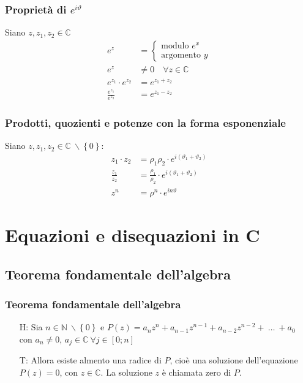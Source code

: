 \documentclass[a4paper]{article}
\begin{document}
\subsubsection*{Proprietà di \(e ^ {i \vartheta}\)}
Siano \(z, z_1, z_2 \in \mathbb{C}\)
\begin{align*}
	e^z &=
	\begin{cases}
		\text{modulo } e^x \\
		\text{argomento } y
	\end{cases} \\
	e ^ z &\neq 0 \quad \forall z \in \mathbb{C} \\
	e ^ {z_1} \cdot e ^ {z_2} &= e ^ {z_1 + z_2} \\
	\frac{e ^ {z_1}}{e ^ {z_2}} &= e ^ {z_1 - z_2}
\end{align*}

\subsubsection*{Prodotti, quozienti e potenze con la forma esponenziale}
Siano \(z, z_1, z_2 \in \mathbb{C} \  \backslash \left\{ 0 \right\}\):
\begin{align*}
	z_1 \cdot z_2 &= \rho_1 \rho_2 \cdot e ^ {i \left( \vartheta_1 + \vartheta_2 \right)} \\
	\frac{z_1}{z_2} &= \frac{\rho_1}{\rho_2} \cdot e ^ {i \left( \vartheta_1 + \vartheta_2 \right)} \\
	z ^ n &= \rho ^ n \cdot e ^ {i n \vartheta}
\end{align*}

\newpage


\section{Equazioni e disequazioni in C}

\subsection{Teorema fondamentale dell'algebra}
\subsubsection*{Teorema fondamentale dell'algebra}
\begin{itemize}
	\item[H: ] Sia \(n \in \mathbb{N} \  \backslash \left\{ 0 \right\}\) e \(P(z) = a_n z^n + a_{n-1} z^{n-1} + a_{n-2} z^{n-2} + \  \dots \  + a_0\) \\
	con \(a_n \neq 0\), \(a_j \in \mathbb{C} \  \forall j \in \left[0; n\right]\) 
	\item[T: ] Allora esiste almento una radice di \(P\), cioè una soluzione dell'equazione \(P(z) = 0\), con \(z \in \mathbb{C}\).
	La soluzione \(z\) è chiamata zero di \(P\).
\end{itemize}
\end{document}

